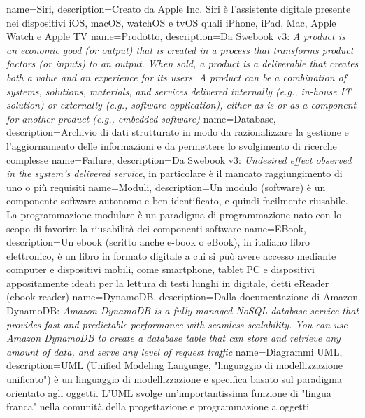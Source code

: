  {
	name=Siri,
	description={Creato da Apple Inc. Siri è l'assistente digitale presente nei dispositivi iOS, macOS, watchOS e tvOS quali iPhone, iPad, Mac, Apple Watch e Apple TV}
}
 {
	name=Prodotto,
	description={Da Swebook v3: \textit{A product is an economic good (or output) that is created in a process that transforms product factors (or inputs) to an output. When sold, a product is a deliverable that creates both a value and an experience for its users. A product can be a combination of systems, solutions, materials, and services delivered internally (e.g., in-house IT solution) or externally (e.g., software application), either as-is or as a component for another
product (e.g., embedded software)}}
}
 {
	name=Database,
	description={Archivio di dati strutturato in modo da razionalizzare la gestione e l'aggiornamento delle informazioni e da permettere lo svolgimento di ricerche complesse}
}
 {
	name=Failure,
	description={Da Swebook v3: \textit{Undesired effect observed in the system’s delivered service}, in particolare è il mancato raggiungimento di uno o più requisiti}
}
 {
	name=Moduli,
	description={Un modulo (software) è un componente software autonomo e ben identificato, e quindi facilmente riusabile. La programmazione modulare è un paradigma di programmazione nato con lo scopo di favorire la riusabilità dei componenti software}
}
 {
	name=EBook,
	description={Un ebook (scritto anche e-book o eBook), in italiano libro elettronico, è un libro in formato digitale a cui si può avere accesso mediante computer e dispositivi mobili, come smartphone, tablet PC e dispositivi appositamente ideati per la lettura di testi lunghi in digitale, detti eReader (ebook reader)}
}
 {
	name=DynamoDB,
	description={Dalla documentazione di Amazon DynamoDB: \textit{Amazon DynamoDB is a fully managed NoSQL database service that provides fast and predictable performance with seamless scalability. You can use Amazon DynamoDB to create a database table that can store and retrieve any amount of data, and serve any level of request traffic}}
}
 {
	name=Diagrammi UML,
	description={UML (Unified Modeling Language, "linguaggio di modellizzazione unificato") è un linguaggio di modellizzazione e specifica basato sul paradigma orientato agli oggetti. L'UML svolge un'importantissima funzione di "lingua franca" nella comunità della progettazione e programmazione a oggetti}
}
